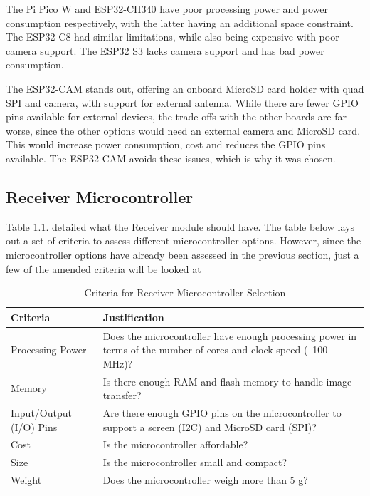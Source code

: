 \documentclass[class=report,11pt,crop=false]{standalone}
\begin{document}
The Pi Pico W and ESP32-CH340 have poor processing power and power consumption respectively, with the latter having an additional space constraint. The ESP32-C8 had similar limitations, while also being expensive with poor camera support. The ESP32 S3 lacks camera support and has bad power consumption. 

The ESP32-CAM stands out, offering an onboard MicroSD card holder with quad SPI and camera, with support for external antenna. While there are fewer GPIO pins available for external devices, the trade-offs with the other boards are far worse, since the other options would need an external camera and MicroSD card. This would increase power consumption, cost and reduces the GPIO pins available. The ESP32-CAM avoids these issues, which is why it was chosen. 


\subsection{Receiver Microcontroller}

Table 1.1. detailed what the Receiver module should have. The table below lays out a set of criteria to assess different microcontroller options. However, since the microcontroller options have already been assessed in the previous section, just a few of the amended criteria will be looked at
\begin{table}[ht]
\centering
\begin{tabular}{|l|p{10cm}|}
\hline
\textbf{Criteria} & \textbf{Justification} \\
\hline
Processing Power & Does the microcontroller have enough processing power in terms of the number of cores and clock speed (~100 MHz)? \\
\hline
Memory & Is there enough RAM and flash memory to handle image transfer? \\
\hline
Input/Output (I/O) Pins & Are there enough GPIO pins on the microcontroller to support a screen (I2C) and MicroSD card (SPI)? \\
\hline
Cost & Is the microcontroller affordable? \\
\hline
Size & Is the microcontroller small and compact? \\
\hline
Weight & Does the microcontroller weigh more than 5 g? \\
\hline
\end{tabular}
\caption{Criteria for Receiver Microcontroller Selection}
\label{tab:microcontroller_criteria3}
\end{table}
\end{document}
